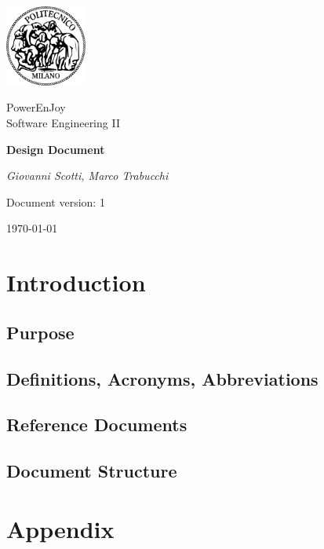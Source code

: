\documentclass[a4paper,12pt]{report}
\begin{document}
\begin{titlepage}
\centering
\includegraphics[width=0.20\textwidth]{./pictures/logo_poli}\par
	\vspace{1.5cm}
	{\Large {PowerEnJoy \\ 
		Software Engineering II} \par}
	\vspace{1.5cm}
	{\LARGE \textbf{Design Document} \par}
	\vspace{1.5cm}
	{\Large\itshape Giovanni Scotti, Marco Trabucchi\par}
	\vspace{2cm}
	\vfill
	{\large Document version: 1\par}
	{\large \today \par}
\end{titlepage}

\tableofcontents

\chapter{Introduction}
\label{ch:Introduction}

\section{Purpose}


\section{Definitions, Acronyms, Abbreviations}


\section{Reference Documents}


\section{Document Structure}


\appendix
\chapter{Appendix}



\end{document}
